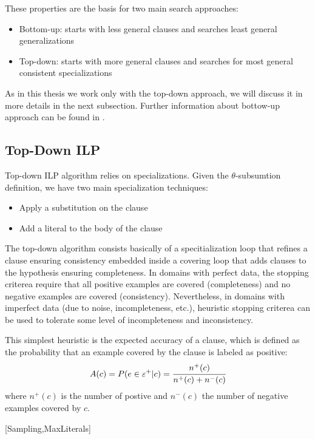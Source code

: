 These properties are the basis for two main search approaches:

\begin{itemize}
 \item Bottom-up: starts with less general clauses and searches least general generalizations
 \item Top-down: starts with more general clauses and searches for most general consistent specializations
\end{itemize}

As in this thesis we work only with the top-down approach, we will discuss it in more details in the next subsection.
Further information about bottow-up approach can be found in \cite{DBLP:journals/ml/LavracD96}.

\subsection{Top-Down ILP}

Top-down ILP algorithm relies on specializations. Given the $\theta$-subsumtion definition, we have two main
specialization techniques:

\begin{itemize}
 \item Apply a substitution on the clause
 \item Add a literal to the body of the clause
\end{itemize}

The top-down algorithm consists basically of a specitialization loop that refines a clause ensuring consistency
embedded inside a covering loop that adds clauses to the hypothesis ensuring completeness. In domains with perfect data,
the stopping criterea require that all positive examples are covered (completeness) and no negative examples are
covered (consistency). Nevertheless, in domains with imperfect data (due to noise, incompleteness, etc.), heuristic
stopping criterea can be used to tolerate some level of incompleteness and inconsistency.

This simplest heuristic is the expected accuracy of a clause, which is defined as the probability that an example
covered by the clause is labeled as positive:
\begin{equation}
A(c)=P(e \in \varepsilon^{+}|c)=\cfrac{n^{+}(c)}{n^{+}(c)+n^{-}(c)} 
\end{equation}
where $n^{+}(c)$ is the number of postive and $n^{-}(c)$ the number of negative examples covered by $c$. 

[Sampling,MaxLiterals]


